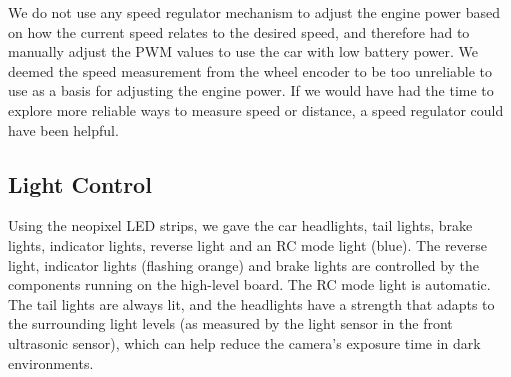 \noindent
We do not use any speed regulator mechanism to adjust the engine power based on
how the current speed relates to the desired speed, and therefore had to
manually adjust the PWM values to use the car with low battery power. We deemed
the speed measurement from the wheel encoder to be too unreliable to use as a
basis for adjusting the engine power. If we would have had the time to explore
more reliable ways to measure speed or distance, a speed regulator could have
been helpful.

\subsection{Light Control}
Using the neopixel LED strips, we gave the car headlights, tail lights, brake
lights, indicator lights, reverse light and an RC mode light (blue). The reverse
light, indicator lights (flashing orange) and brake lights are controlled by the
components running on the high-level board. The RC mode light is automatic. The
tail lights are always lit, and the headlights have a strength that adapts to
the surrounding light levels (as measured by the light sensor in the front
ultrasonic sensor),  which can help reduce the camera’s exposure time in dark
environments.